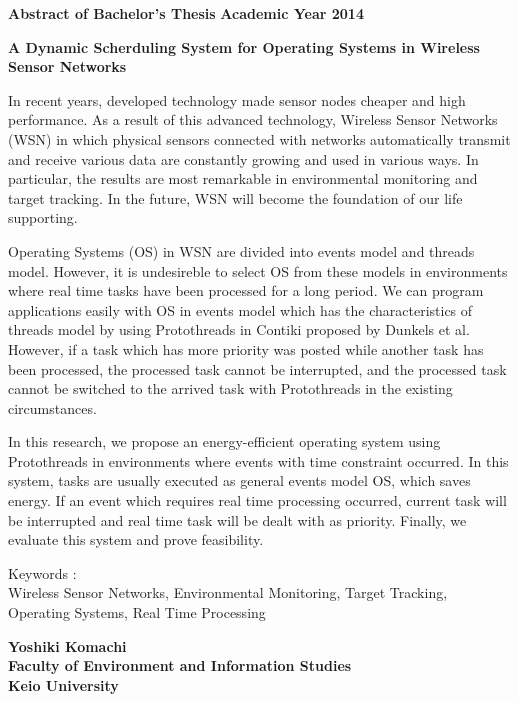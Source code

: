 \newpage

\begin{center}
\textbf{\Large Abstract of Bachelor's Thesis}
\textbf{\Large Academic Year 2014}
\vspace{6.18mm}

\textbf{\Large A Dynamic Scherduling System for Operating Systems in Wireless Sensor Networks}
\end{center}

\vspace{10mm}

In recent years, 
developed technology made 
sensor nodes cheaper and high performance.
As a result of this advanced technology, 
Wireless Sensor Networks (WSN) 
in which physical sensors connected with networks
automatically transmit and receive various data 
are constantly growing and used in various ways.
In particular, the results are most remarkable
in environmental monitoring and target tracking.
In the future, WSN will become the foundation of our life supporting. 

Operating Systems (OS) in WSN
are divided into events model and threads model.
However, it is undesireble to 
select OS from these models  
in environments where 
real time tasks have been processed 
for a long period.
We can program applications easily
with OS
in events model which
has the characteristics of threads model
by using Protothreads\cite{Dunkels:2006:PSE:1182807.1182811} 
in Contiki\cite{Dunkels:2004:CLF:1032658.1034117}
proposed by Dunkels et al.
However, 
if a task which has more priority was posted 
while another task has been processed,
the processed task cannot be interrupted,
and the processed task cannot be switched to the arrived task 
with Protothreads
in the existing circumstances.

In this research, we propose an energy-efficient operating system 
using Protothreads
in environments where events with time constraint occurred.
In this system,
tasks are usually executed as general events model OS, 
which saves energy.
If an event which requires real time processing occurred,
current task will be interrupted and 
real time task will be dealt with as priority.
Finally, we evaluate this system and prove feasibility.


\vspace{10mm}
Keywords :\\
\hspace{3.5em}Wireless Sensor Networks, Environmental Monitoring, Target Tracking, Operating Systems, Real Time Processing 
\begin{flushright}
\textbf{Yoshiki Komachi}\\
\vspace{5mm}
\textbf{Faculty of Environment and Information Studies}\\
\textbf{Keio University}
\end{flushright}
